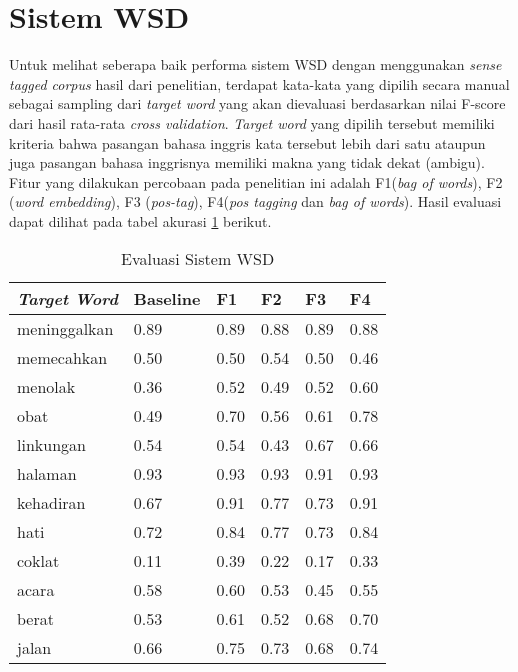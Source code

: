 \section{Sistem WSD}

Untuk melihat seberapa baik performa sistem WSD dengan menggunakan \textit{sense tagged corpus} hasil dari penelitian, terdapat kata-kata yang dipilih secara manual sebagai sampling dari \textit{target word} yang akan dievaluasi berdasarkan nilai F-score dari hasil rata-rata \textit{cross validation}. \textit{Target word} yang dipilih tersebut memiliki kriteria bahwa pasangan bahasa inggris kata tersebut lebih dari satu ataupun juga pasangan bahasa inggrisnya memiliki makna yang tidak dekat (ambigu). Fitur yang dilakukan percobaan pada penelitian ini adalah F1(\textit{bag of words}), F2 (\textit{word embedding}), F3 (\textit{pos-tag}), F4(\textit{pos tagging} dan \textit{bag of words}). Hasil evaluasi dapat dilihat pada tabel akurasi  \ref{table:wsd-evaluation} berikut.


\begin{table}
	\centering
	\caption{Evaluasi Sistem WSD}
	\label{table:wsd-evaluation}
	\begin{tabular}{|p{3cm}|p{1.5cm}|p{1.5cm}|p{1.5cm}|p{1.5cm}|p{1.5cm}|}
		\hline
		\textit{Target Word} & Baseline & F1 & F2 & F3 & F4
		\\ \hline
		meninggalkan & 0.89 & 0.89 & 0.88 & 0.89 & 0.88
		\\ \hline
		memecahkan & 0.50 & 0.50 & \cellcolor{blue!25}0.54 & 0.50 & 0.46
		\\ \hline
		menolak & 0.36 & \cellcolor{blue!25}0.52 & \cellcolor{blue!25}0.49 & \cellcolor{blue!25}0.52 & \cellcolor{blue!25}0.60
		\\ \hline
		obat & 0.49 & \cellcolor{blue!25}0.70 & \cellcolor{blue!25}0.56 & \cellcolor{blue!25}0.61 & \cellcolor{blue!25}0.78
		\\ \hline
		linkungan & 0.54 & 0.54 & 0.43 & \cellcolor{blue!25}0.67 & \cellcolor{blue!25}0.66
		\\ \hline
		halaman & 0.93 & 0.93 & 0.93 & 0.91 & 0.93
		\\ \hline
		kehadiran & 0.67 & \cellcolor{blue!25}0.91 & \cellcolor{blue!25}0.77 & \cellcolor{blue!25}0.73 & \cellcolor{blue!25}0.91
		\\ \hline
		hati & 0.72 & \cellcolor{blue!25}0.84 & \cellcolor{blue!25}0.77 & \cellcolor{blue!25}0.73 & \cellcolor{blue!25}0.84
		\\ \hline
		coklat & 0.11 & \cellcolor{blue!25}0.39 & \cellcolor{blue!25}0.22 & \cellcolor{blue!25}0.17 & \cellcolor{blue!25}0.33
		\\ \hline
		acara & 0.58 & \cellcolor{blue!25}0.60 & 0.53 & 0.45 & 0.55
		\\ \hline
		berat & 0.53 & \cellcolor{blue!25}0.61 & 0.52 & \cellcolor{blue!25}0.68 & \cellcolor{blue!25}0.70
		\\ \hline
		jalan & 0.66 & \cellcolor{blue!25}0.75 & \cellcolor{blue!25}0.73 & \cellcolor{blue!25}0.68 & \cellcolor{blue!25}0.74
		\\ \hline
	\end{tabular}
\end{table}

